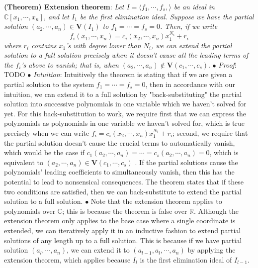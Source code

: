 \documentclass{article}
\begin{document}
\textbf{(Theorem) Extension theorem}: \textit{Let $ I = \langle f_1, \cdots, f_s, \rangle $ be an ideal in $ \mathbb{C}[x_1, \cdots, x_n] $, and let $ I_1 $ be the first elimination ideal. Suppose we have the partial solution $ (a_2, \cdots, a_n) \in \mathbf{V}(I_1) $ to $ f_1 = \cdots = f_s = 0 $. Then, if we write}
$$ f_i(x_1, \cdots, x_n) = c_i(x_2, \cdots, x_n) x_1^{N_i} + r_i $$
\indent \textit{where $ r_i $ contains $ x_1 $'s with degree lower than $ N_i $, we can extend the partial solution to a full solution precisely when it doesn't cause all the leading terms of the $ f_i $'s above to vanish; that is, when $ (a_2, \cdots, a_n) \notin \mathbf{V}(c_1, \cdots, c_s) $}.
\newline
\indent $ \bullet $ \textit{Proof}: TODO
\newline
\indent $ \bullet $ \textit{Intuition}: Intuitively the theorem is stating that if we are given a partial solution to the system $ f_1 = \cdots = f_s = 0 $, then in accordance with our intuition, we can extend it to a full solution by "back-substituting" the partial solution into successive polynomials in one variable which we haven't solved for yet. For this back-substitution to work, we require first that we can express the polynomials as polynomials in one variable we haven't solved for, which is true precisely when we can write $ f_i = c_i(x_2, \cdots, x_n) x_1^{N_i} + r_i $; second, we require that the partial solution doesn't cause the crucial terms to automatically vanish, which would be the case if $ c_1(a_2, \cdots, a_n) = \cdots = c_s(a_2, \cdots, a_n) = 0 $, which is equivalent to $ (a_2, \cdots, a_n) \in \mathbf{V}(c_1, \cdots, c_s) $
. If the partial solutions cause the polynomials' leading coefficients to simultaneously vanish, then this has the potential to lead to nonsensical consequences. The theorem states that if these two conditions are satisfied, then we can back-substitute to extend the partial solution to a full solution.
\newline
\indent $ \bullet $ Note that the extension theorem applies to polynomials over $ \mathbb{C} $; this is because the theorem is false over $ \mathbb{R} $.
\newline \newline
Although the extension theorem only applies to the base case where a single coordinate is extended, we can iteratively apply it in an inductive fashion to extend partial solutions of any length up to a full solution. This is because if we have partial solution $ (a_l, \cdots, a_n) $, we can extend it to $ (a_{l - 1}, a_l, \cdots, a_n) $ by applying the extension theorem, which applies because $ I_l $ is the first elimination ideal of $ I_{l - 1} $.
\end{document}
